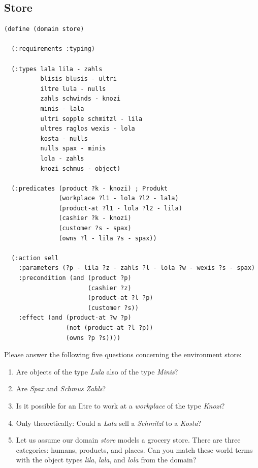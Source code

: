 \documentclass[runningheads]{llncs}
\begin{document}
\subsection{Store}
\label{store}
\begin{verbatim}
(define (domain store)

  (:requirements :typing)

  (:types lala lila - zahls
          blisis blusis - ultri
          iltre lula - nulls
          zahls schwinds - knozi
          minis - lala
          ultri sopple schmitzl - lila
          ultres raglos wexis - lola
          kosta - nulls
          nulls spax - minis
          lola - zahls
          knozi schmus - object)

  (:predicates (product ?k - knozi) ; Produkt
               (workplace ?l1 - lola ?l2 - lala) 
               (product-at ?l1 - lola ?l2 - lila) 
               (cashier ?k - knozi) 
               (customer ?s - spax)
               (owns ?l - lila ?s - spax)) 

  (:action sell
    :parameters (?p - lila ?z - zahls ?l - lola ?w - wexis ?s - spax)
    :precondition (and (product ?p)
                       (cashier ?z)
                       (product-at ?l ?p)
                       (customer ?s))
    :effect (and (product-at ?w ?p)
                 (not (product-at ?l ?p))
                 (owns ?p ?s))))
\end{verbatim}
Please answer the following five questions concerning the environment
store:
\begin{enumerate}
\item Are objects of the type \emph{Lula} also of the type
    \emph{Minis}?
\item Are \emph{Spax} and \emph{Schmus} \emph{Zahls}?
\item Is it possible for an Iltre to work at a
    \emph{workplace} of the type \emph{Knozi}?
\item Only theoretically: Could a \emph{Lala} sell a
    \emph{Schmitzl} to a \emph{Kosta}?
\item Let us assume our domain \emph{store} models a
    grocery store. There are three categories: humans, products, and
    places. Can you match these world terms with the object types
    \emph{lila}, \emph{lala}, and \emph{lola} from the domain?
\end{enumerate}
\end{document}
